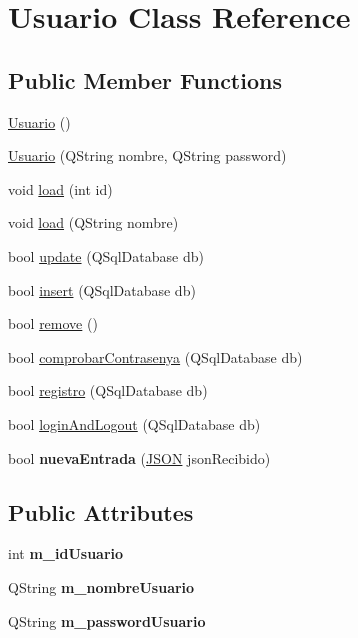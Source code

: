 \hypertarget{classUsuario}{}\section{Usuario Class Reference}
\label{classUsuario}
\subsection*{Public Member Functions}
\begin{DoxyCompactItemize}
\item 
\mbox{\hyperlink{classUsuario_aa85a5371a098dfba5449140d9b8a472f}{Usuario}} ()
\item 
\mbox{\hyperlink{classUsuario_a21975acad49ffd19aa3cf818d03527ad}{Usuario}} (Q\+String nombre, Q\+String password)
\item 
void \mbox{\hyperlink{classUsuario_a582cfc5fb035575f66240d1784c50632}{load}} (int id)
\item 
void \mbox{\hyperlink{classUsuario_ab1cdc9970f8f50f4b554a563fd2ab41d}{load}} (Q\+String nombre)
\item 
bool \mbox{\hyperlink{classUsuario_af4164d59cbff1c6b19bd489b1cacf743}{update}} (Q\+Sql\+Database db)
\item 
bool \mbox{\hyperlink{classUsuario_a26adf3b94603d9265f4de3fc69753f25}{insert}} (Q\+Sql\+Database db)
\item 
bool \mbox{\hyperlink{classUsuario_a2e01f0e772aabe9c66ef326eca458405}{remove}} ()
\item 
bool \mbox{\hyperlink{classUsuario_a22724fa57c4b6eca3330b8bc384700b5}{comprobar\+Contrasenya}} (Q\+Sql\+Database db)
\item 
bool \mbox{\hyperlink{classUsuario_a8c8c3ee57470ff27e9da55f6e6eb0d17}{registro}} (Q\+Sql\+Database db)
\item 
bool \mbox{\hyperlink{classUsuario_a800927743ba5e998af9a6040baea0b88}{login\+And\+Logout}} (Q\+Sql\+Database db)
\item 
\mbox{\label{classUsuario_a8776b368054f04bf01dd238efe19166d}} 
bool {\bfseries nueva\+Entrada} (\mbox{\hyperlink{classnlohmann_1_1basic__json}{J\+S\+ON}} json\+Recibido)
\end{DoxyCompactItemize}
\subsection*{Public Attributes}
\begin{DoxyCompactItemize}
\item 
\mbox{\label{classUsuario_adceaf46ad17f76c19ec6f2a98baba133}} 
int {\bfseries m\+\_\+id\+Usuario}
\item 
\mbox{\label{classUsuario_a69a690d2e969ab1b32ae18f94e0fb0e3}} 
Q\+String {\bfseries m\+\_\+nombre\+Usuario}
\item 
\mbox{\label{classUsuario_a6771c927d80c3c8495ed08c16dfc8488}} 
Q\+String {\bfseries m\+\_\+password\+Usuario}
\end{DoxyCompactItemize}


